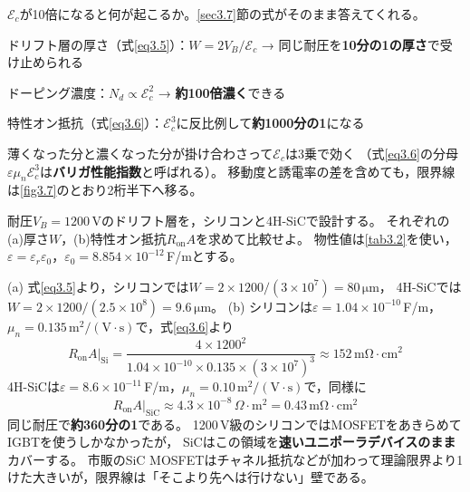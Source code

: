 $\mathcal{E}_c$が10倍になると何が起こるか。\ref{sec3.7}節の式がそのまま答えてくれる。

\begin{箇条書}
\item ドリフト層の厚さ（式\ref{eq3.5}）：$W = 2V_B/\mathcal{E}_c$ → 同じ耐圧を\textbf{10分の1の厚さ}で受け止められる
\item ドーピング濃度：$N_d \propto \mathcal{E}_c^2$ → \textbf{約100倍濃く}できる
\item 特性オン抵抗（式\ref{eq3.6}）：$\mathcal{E}_c^3$に反比例して\textbf{約1000分の1}になる
\end{箇条書}

薄くなった分と濃くなった分が掛け合わさって$\mathcal{E}_c$は3乗で効く
（式\ref{eq3.6}の分母$\varepsilon\mu_n\mathcal{E}_c^3$は\textbf{バリガ性能指数}と呼ばれる）。
移動度と誘電率の差を含めても，限界線は\ref{fig3.7}のとおり2桁半下へ移る。

\begin{例題}
\label{rei3.2}
耐圧$V_B = 1200$\,Vのドリフト層を，シリコンと4H-SiCで設計する。
それぞれの(a)厚さ$W$，(b)特性オン抵抗$R_{\mathrm{on}}A$を求めて比較せよ。
物性値は\ref{tab3.2}を使い，$\varepsilon = \varepsilon_r\varepsilon_0$，$\varepsilon_0 = 8.854\times10^{-12}$\,F/mとする。
\begin{解答}
(a) 式\ref{eq3.5}より，シリコンでは$W = 2\times1200/(3\times10^7) = 80\,\mathrm{\mu m}$，
4H-SiCでは$W = 2\times1200/(2.5\times10^8) = 9.6\,\mathrm{\mu m}$。
(b) シリコンは$\varepsilon = 1.04\times10^{-10}$\,F/m，$\mu_n = 0.135\,\mathrm{m^2/(V\cdot s)}$で，式\ref{eq3.6}より
\begin{equation*}
R_{\mathrm{on}}A|_{\mathrm{Si}}
= \frac{4\times1200^2}{1.04\times10^{-10}\times0.135\times(3\times10^7)^3}
\approx 152\,\mathrm{m\Omega\cdot cm^2}
\end{equation*}
4H-SiCは$\varepsilon = 8.6\times10^{-11}$\,F/m，$\mu_n = 0.10\,\mathrm{m^2/(V\cdot s)}$で，同様に
\begin{equation*}
R_{\mathrm{on}}A|_{\mathrm{SiC}} \approx 4.3\times10^{-8}\,\Omega\cdot\mathrm{m^2} = 0.43\,\mathrm{m\Omega\cdot cm^2}
\end{equation*}
同じ耐圧で\textbf{約360分の1}である。
1200\,V級のシリコンではMOSFETをあきらめてIGBTを使うしかなかったが，
SiCはこの領域を\textbf{速いユニポーラデバイスのまま}カバーする。
市販のSiC MOSFETはチャネル抵抗などが加わって理論限界より1けた大きいが，限界線は「そこより先へは行けない」壁である。
\end{解答}
\end{例題}

